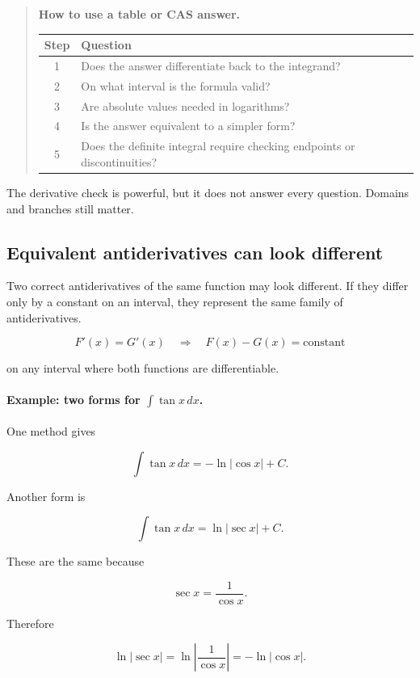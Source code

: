 \begin{quote}
\textbf{How to use a table or CAS answer.}

\begin{center}
\begin{tabular}{c|p{}}
\textbf{Step} & \textbf{Question} \\ \hline
1 & Does the answer differentiate back to the integrand? \\[4pt]
2 & On what interval is the formula valid? \\[4pt]
3 & Are absolute values needed in logarithms? \\[4pt]
4 & Is the answer equivalent to a simpler form? \\[4pt]
5 & Does the definite integral require checking endpoints or discontinuities?
\end{tabular}
\end{center}
\end{quote}

The derivative check is powerful, but it does not answer every question.  Domains and
branches still matter.

\subsection{Equivalent antiderivatives can look different}
\label{subsec:equivalent-antiderivatives}

Two correct antiderivatives of the same function may look different.  If they differ only
by a constant on an interval, they represent the same family of antiderivatives.

\[
F'(x)=G'(x)
\quad\Longrightarrow\quad
F(x)-G(x)=\text{constant}
\]

on any interval where both functions are differentiable.

\paragraph{Example: two forms for \(\int \tan x\,dx\).}
One method gives

\[
\int \tan x\,dx
=
-\ln|\cos x|+C.
\]

Another form is

\[
\int \tan x\,dx
=
\ln|\sec x|+C.
\]

These are the same because

\[
\sec x=\frac1{\cos x}.
\]

Therefore

\[
\ln|\sec x|
=
\ln\left|\frac1{\cos x}\right|
=
-\ln|\cos x|.
\]


